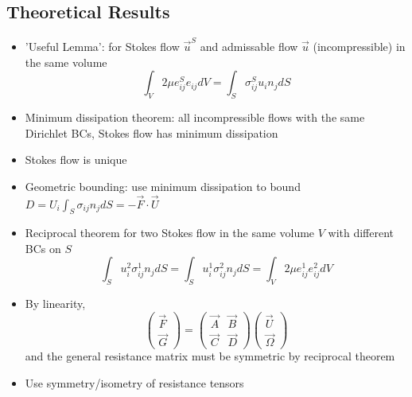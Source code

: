 \subsection*{Theoretical Results}
\begin{itemize}
    \item 'Useful Lemma': for Stokes flow $\vec{u}^S$ and admissable flow $\vec{u}$ (incompressible) in the same volume \[\int_V2\mu e_{ij}^S e_{ij} dV = \int_S\sigma_{ij}^S u_i n_j dS\]
    \item Minimum dissipation theorem: all incompressible flows with the same Dirichlet BCs, Stokes flow has minimum dissipation
    \item Stokes flow is unique
    \item Geometric bounding: use minimum dissipation to bound $ D = U_i \int_S \sigma_{ij} n_j dS = -\vec{F}\cdot \vec{U}$
    \item Reciprocal theorem for two Stokes flow in the same volume $V$ with different BCs on $S$
          \[\int_S u_i^2 \sigma_{ij}^1 n_j  dS = \int_S u_i^1\sigma_{ij}^2 n_j  dS = \int_V 2\mu e_{ij}^1 e_{ij}^2 dV\]
    \item By linearity, \[\begin{pmatrix}
                  \vec{F} \\ \vec{G} \end{pmatrix} =
              \begin{pmatrix}
                  \vec{A} & \vec{B} \\
                  \vec{C} & \vec{D}
              \end{pmatrix}
              \begin{pmatrix}
                  \vec{U} \\ \vec{\Omega}
              \end{pmatrix}\] and the general resistance matrix must be symmetric by reciprocal theorem
    \item Use symmetry/isometry of resistance tensors
\end{itemize}

